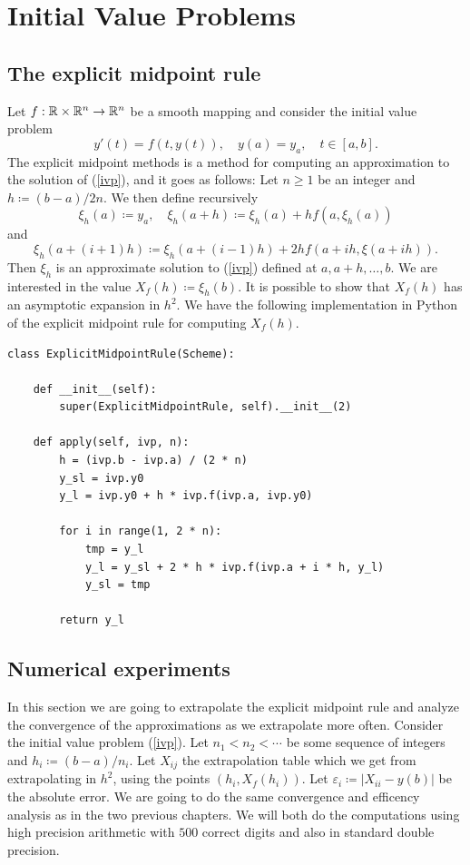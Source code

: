 \chapter{Initial Value Problems}

\section{The explicit midpoint rule}

Let \(f: \mathbb{R}\times \mathbb{R}^n \rightarrow \mathbb{R}^n\) be a smooth mapping and consider the initial value problem 
\begin{equation}\label{ivp}
y'(t) = f(t, y(t)), \quad y(a) = y_a, \quad t\in [a,b].
\end{equation}
The explicit midpoint methods is a method for computing an approximation to the solution of (\ref{ivp}), and it goes as follows: Let \(n\geq 1\) be an integer and \(h\coloneqq (b-a)/2n\). We then define recursively
\[
\xi_h(a) \coloneqq y_a, \quad \xi_h(a+h) \coloneqq \xi_h(a) + hf(a, \xi_h(a))
\]
and
\[
\xi_h(a + (i+1)h) \coloneqq \xi_h(a+(i-1)h) + 2hf(a+ih, \xi(a+ih)).
\]
Then \(\xi_h\) is an approximate solution to (\ref{ivp}) defined at \(a, a+h,\ldots ,b\). We are interested in the value \(X_f(h)\coloneqq \xi_h(b)\). It is possible to show that \(X_f(h)\) has an asymptotic expansion in \(h^2\). We have the following implementation in Python of the explicit midpoint rule for computing \(X_f(h)\).

\begin{verbatim}
class ExplicitMidpointRule(Scheme):

	def __init__(self):
		super(ExplicitMidpointRule, self).__init__(2)

	def apply(self, ivp, n):
		h = (ivp.b - ivp.a) / (2 * n)
		y_sl = ivp.y0
		y_l = ivp.y0 + h * ivp.f(ivp.a, ivp.y0)

		for i in range(1, 2 * n):
			tmp = y_l
			y_l = y_sl + 2 * h * ivp.f(ivp.a + i * h, y_l)
			y_sl = tmp

		return y_l
\end{verbatim}

\section{Numerical experiments}

In this section we are going to extrapolate the explicit midpoint rule and analyze the convergence of the approximations as we extrapolate more often. Consider the initial value problem (\ref{ivp}). Let \(n_1 < n_2 < \cdots\) be some sequence of integers and \(h_i \coloneqq (b-a) / n_i\). Let \(X_{ij}\) the extrapolation table which we get from extrapolating in \(h^2\), using the points \((h_i,X_f(h_i))\). Let \(\varepsilon_i \coloneqq |X_{ii} - y(b)|\) be the absolute error. We are going to do the same convergence and efficency analysis as in the two previous chapters. We will both do the computations using high precision arithmetic with \(500\) correct digits and also in standard double precision.\\

